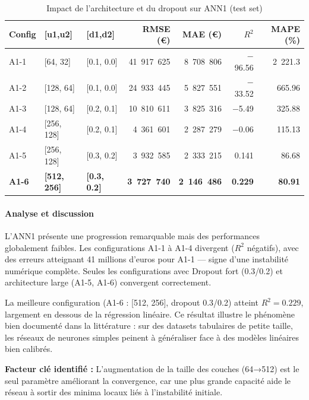 \documentclass[12pt,a4paper]{article}
\begin{document}
\begin{table}[H]
\centering
\begin{tabular}{@{}lllrrrr@{}}
\toprule
\textbf{Config} & \textbf{[u1,u2]} & \textbf{[d1,d2]} &
\textbf{RMSE (€)} & \textbf{MAE (€)} & \textbf{$R^2$} & \textbf{MAPE (\%)} \\ \midrule
A1-1 & [64, 32]   & [0.1, 0.0] & 41~917~625 & 8~708~806 & $-$96.56 & 2~221.3 \\
A1-2 & [128, 64]  & [0.1, 0.0] & 24~933~445 & 5~827~551 & $-$33.52 & 665.96  \\
A1-3 & [128, 64]  & [0.2, 0.1] & 10~810~611 & 3~825~316 & $-$5.49  & 325.88  \\
A1-4 & [256, 128] & [0.2, 0.1] &  4~361~601 & 2~287~279 & $-$0.06  & 115.13  \\
A1-5 & [256, 128] & [0.3, 0.2] &  3~932~585 & 2~333~215 & 0.141   & 86.68   \\
\textbf{A1-6} & \textbf{[512, 256]} & \textbf{[0.3, 0.2]} &
\textbf{3~727~740} & \textbf{2~146~486} & \textbf{0.229} & \textbf{80.91} \\ \midrule
\end{tabular}
\caption{Impact de l'architecture et du dropout sur ANN1 (test set)}
\end{table}

\paragraph{Analyse et discussion}

L'ANN1 présente une progression remarquable mais des performances globalement faibles.
Les configurations A1-1 à A1-4 divergent ($R^2$ négatifs), avec des erreurs
atteignant 41 millions d'euros pour A1-1 — signe d'une instabilité numérique
complète. Seules les configurations avec Dropout fort (0.3/0.2) et architecture large
(A1-5, A1-6) convergent correctement.

La meilleure configuration (A1-6 : [512, 256], dropout 0.3/0.2) atteint $R^2 = 0.229$,
largement en dessous de la régression linéaire. Ce résultat illustre le phénomène
bien documenté dans la littérature : sur des datasets tabulaires de petite taille,
les réseaux de neurones simples peinent à généraliser face à des modèles linéaires
bien calibrés.

\textbf{Facteur clé identifié :} L'augmentation de la taille des couches (64→512)
est le seul paramètre améliorant la convergence, car une plus grande capacité aide
le réseau à sortir des minima locaux liés à l'instabilité initiale.
\end{document}
